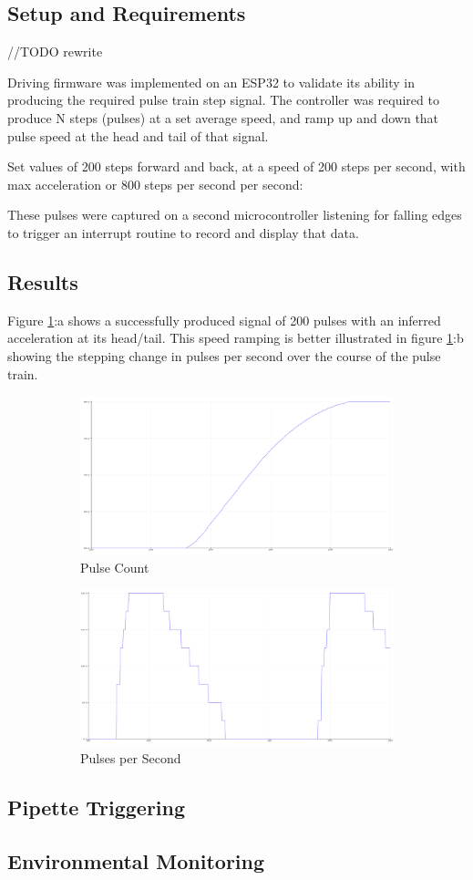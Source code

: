 \subsection{Setup and Requirements}
//TODO rewrite

Driving firmware was implemented on an ESP32 to validate its ability in producing the required pulse train step signal. The controller was required to produce N steps (pulses) at a set average speed, and ramp up and down that pulse speed at the head and tail of that signal.

Set values of 200 steps forward and back, at a speed of 200 steps per second, with max acceleration or 800 steps per second per second:

These pulses were captured on a second microcontroller listening for falling edges to trigger an interrupt routine to record and display that data.

\subsection{Results}

Figure \ref{fig:code}:a shows a successfully produced signal of 200 pulses with an inferred acceleration at its head/tail. This speed ramping is better illustrated in figure \ref{fig:code}:b showing the stepping change in pulses per second over the course of the pulse train.

\begin{figure}[h]
    \centering
    \begin{subfigure}{.45\textwidth}
        \centering
        \includegraphics[width=0.8\linewidth]{img/stepper_pulses.PNG}
        \caption{Pulse Count}
    \end{subfigure}%
    \begin{subfigure}{.45\textwidth}
        \centering
        \includegraphics[width=0.8\linewidth]{img/stepper_pulse_acc.PNG}
        \caption{Pulses per Second}
    \end{subfigure}
    \caption{}
    \label{fig:code}
\end{figure}

\subsection{Pipette Triggering}

\subsection{Environmental Monitoring}
